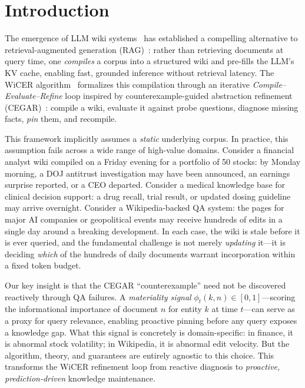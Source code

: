 \documentclass{article}
\begin{document}
\section{Introduction}
\label{sec:introduction}

The emergence of LLM wiki systems~\citep{huerta2026wicer, kang2024cag} has established a compelling alternative to retrieval-augmented generation (RAG)~\citep{lewis2020rag}: rather than retrieving documents at query time, one \emph{compiles} a corpus into a structured wiki and pre-fills the LLM's KV cache, enabling fast, grounded inference without retrieval latency.
The WiCER algorithm~\citep{huerta2026wicer} formalizes this compilation through an iterative \emph{Compile--Evaluate--Refine} loop inspired by counterexample-guided abstraction refinement (CEGAR)~\citep{clarke2000cegar}: compile a wiki, evaluate it against probe questions, diagnose missing facts, \emph{pin} them, and recompile.

This framework implicitly assumes a \emph{static} underlying corpus.
In practice, this assumption fails across a wide range of high-value domains.
Consider a financial analyst wiki compiled on a Friday evening for a portfolio of 50 stocks: by Monday morning, a DOJ antitrust investigation may have been announced, an earnings surprise reported, or a CEO departed.
Consider a medical knowledge base for clinical decision support: a drug recall, trial result, or updated dosing guideline may arrive overnight.
Consider a Wikipedia-backed QA system: the pages for major AI companies or geopolitical events may receive hundreds of edits in a single day around a breaking development.
In each case, the wiki is stale before it is ever queried, and the fundamental challenge is not merely \emph{updating} it---it is deciding \emph{which} of the hundreds of daily documents warrant incorporation within a fixed token budget.

Our key insight is that the CEGAR ``counterexample'' need not be discovered reactively through QA failures.
A \emph{materiality signal} $\phi_t(k,n) \in [0,1]$---scoring the informational importance of document $n$ for entity $k$ at time $t$---can serve as a proxy for query relevance, enabling proactive pinning before any query exposes a knowledge gap.
What this signal is concretely is domain-specific: in finance, it is abnormal stock volatility; in Wikipedia, it is abnormal edit velocity.
But the algorithm, theory, and guarantees are entirely agnostic to this choice.
This transforms the WiCER refinement loop from reactive diagnosis to \emph{proactive, prediction-driven} knowledge maintenance.
\end{document}
